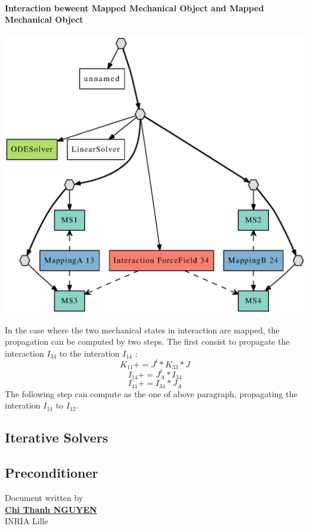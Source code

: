 \documentclass[a4paper,10pt]{article}
\begin{document}
\paragraph{Interaction beweent Mapped Mechanical Object and Mapped Mechanical Object}
\begin{center}
  \includegraphics[scale=0.3]{interaction_Mapped_Mapped}
\end{center}
In the case where the two mechanical states in interaction are mapped, the propagation can be computed by two steps. The first consist to propagate the interaction $I_{34}$ to the interation $I_{14}$ :
\[
K_{11} += J^t * K_{33} * J 
\]
\[
I_{14} += J^t_A * I_{34}
\]
\[
I_{41} += I_{34} * J_A 
\]
The following step can compute as the one of above paragraph, propagating the interation $I_{14}$ to $I_{12}$.
\subsection{Iterative Solvers }
\subsection{Preconditioner }



						      \begin{flushright}
						      Document written by \\
						      \href{mailto:chi-thanh.nguyen@inria.fr}{{\textbf {Chi Thanh NGUYEN}}} \\
						      INRIA Lille
						      \end{flushright}

%
%
\end{document}
